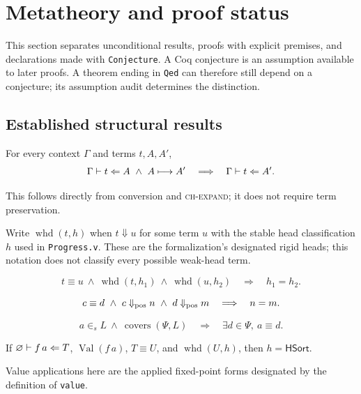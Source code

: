 \section{Metatheory and proof status}
This section separates unconditional results, proofs with explicit premises, and declarations made with \texttt{Conjecture}. A Coq conjecture is an assumption available to later proofs. A theorem ending in \texttt{Qed} can therefore still depend on a conjecture; its assumption audit determines the distinction.

\subsection{Established structural results}
\begin{theorem}
For every context $\Gamma$ and terms $t,A,A'$,
\[
\Gamma\vdash t\Leftarrow A\ \land\ A\longmapsto A'
\quad\Longrightarrow\quad\Gamma\vdash t\Leftarrow A'.
\]
\end{theorem}
\noindent This follows directly from conversion and \textsc{ch-expand}; it does not require term preservation.

Write $\operatorname{whd}(t,h)$ when $t\Downarrow u$ for some term $u$ with the stable head classification $h$ used in \texttt{Progress.v}. These are the formalization's designated rigid heads; this notation does not classify every possible weak-head term.
\begin{theorem}
\[
 t\equiv u\ \land\ \operatorname{whd}(t,h_1)\ \land\ \operatorname{whd}(u,h_2)
 \quad\Longrightarrow\quad h_1=h_2.
\]
\end{theorem}
\begin{theorem}
\[
 c\equiv d\ \land\ c\Downarrow_{\rm pos}n\ \land\ d\Downarrow_{\rm pos}m
 \quad\Longrightarrow\quad n=m.
\]
\end{theorem}
\begin{theorem}
\[
 a\in_s L\ \land\ \operatorname{covers}(\Psi,L)
 \quad\Longrightarrow\quad\exists d\in\Psi,\ a\equiv d.
\]
\end{theorem}
\begin{theorem}
If $\varnothing\vdash f\,a\Leftarrow T$, $\operatorname{Val}(f\,a)$, $T\equiv U$, and $\operatorname{whd}(U,h)$, then $h=\mathsf{HSort}$.
\end{theorem}
\noindent Value applications here are the applied fixed-point forms designated by the definition of \texttt{value}.

